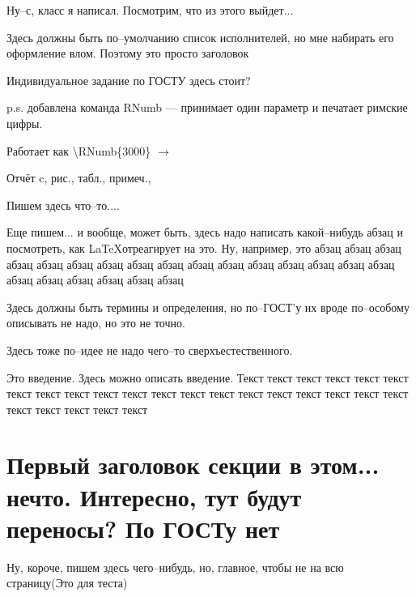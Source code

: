 \documentclass{article}
\begin{document}
{\Huge
Ну--с, класс я написал. Посмотрим, что из этого выйдет...

}


\Executors

Здесь должны быть по--умолчанию список исполнителей, но мне набирать его оформление влом. Поэтому это просто заголовок

\IndividualTask

Индивидуальное задание по ГОСТУ здесь стоит?

p.s. добавлена команда RNumb --- принимает один параметр и печатает римские цифры.

Работает как \textbackslash RNumb\{3000\} $\longrightarrow$ 

\Repherat

Отчёт \totalpages{} c, \totalfigures{} рис., \totaltables{} табл., \totalappendix{} примеч.,


Пишем здесь что--то....

Еще пишем... и вообще, может быть, здесь надо написать какой--нибудь абзац и посмотреть, как \LaTeX отреагирует на это. Ну, например, это абзац  абзац абзац абзац абзац абзац абзац абзац абзац абзац абзац абзац абзац абзац абзац абзац абзац абзац абзац абзац абзац абзац

\newpage

\tableofcontents

\TermAndDefine

Здесь должны быть термины и определения, но по--ГОСТ'у их вроде по--особому описывать не надо, но это не точно.

\listAbbreviationAndNotation

Здесь тоже по--идее не надо чего--то сверхъестественного.

\Intoduction

Это введение. Здесь можно описать введение. Текст текст текст текст текст текст текст текст текст текст текст текст текст текст текст текст текст текст текст текст текст текст текст текст текст

\section{Первый заголовок секции в этом... нечто. Интересно, тут будут переносы? По ГОСТу нет}

Ну, короче, пишем здесь чего--нибудь, но, главное, чтобы не на всю страницу(Это для теста)
\end{document}
